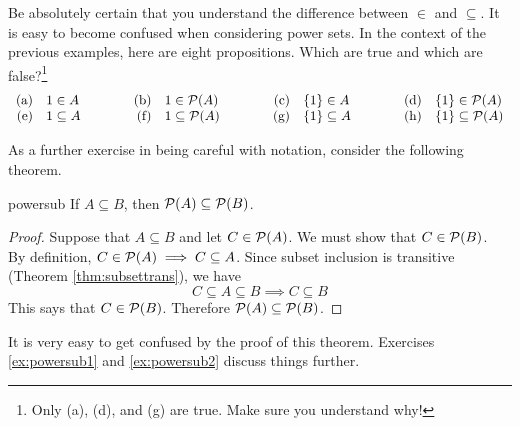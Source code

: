 
Be absolutely certain that you understand the difference between $\in$ and $\subseteq$. It is easy to become confused when considering power sets. In the context of the previous examples, here are eight propositions. Which are true and which are false?\footnote{Only (a), (d), and (g) are true. Make sure you understand why!}
\[
	\begin{array}{r@{\quad}l@{\qquad\qquad}r@{\quad}l@{\qquad\qquad}r@{\quad}l@{\qquad\qquad}r@{\quad}l}
		\text{(a)}&1\in A
				&\text{(b)}&1\in\cP(A)
				&\text{(c)}&\{1\}\in A
				&\text{(d)}&\{1\}\in\cP(A)\\
		\text{(e)}&1\subseteq A
				&\text{(f)}&1\subseteq\cP(A)
				&\text{(g)}&\{1\}\subseteq A
				&\text{(h)}&\{1\}\subseteq\cP(A)
	\end{array}
\]

As a further exercise in being careful with notation, consider the following theorem.

\begin{thm}{}{powersub}
	If $A\subseteq B$, then $\mathcal{P}(A)\subseteq\mathcal{P}(B)$.
\end{thm}

\begin{proof}
	Suppose that $A\subseteq B$ and let $C\in\mathcal{P}(A)$. We must show that $C\in\mathcal{P}(B)$.\\
	By definition, $C\in\mathcal{P}(A)\implies C\subseteq A$. Since subset inclusion is transitive (Theorem \hyperlink{thm:subsettranslnk}{\ref*{thm:subsettrans}}), we have
	\[
		C\subseteq A\subseteq B\implies C\subseteq B
	\]
	This says that $C\in\mathcal{P}(B)$. Therefore $\mathcal{P}(A)\subseteq\mathcal{P}(B)$.
\end{proof}

It is very easy to get confused by the proof of this theorem. Exercises \ref{ex:powersub1} and \ref{ex:powersub2} discuss things further.




